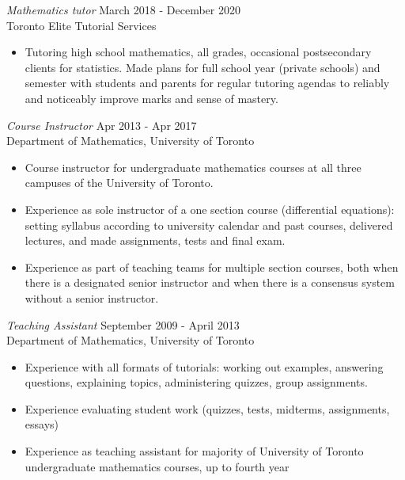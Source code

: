 \documentclass[margin, 10pt]{res} %
\begin{document}
\begin{resume}
{\sl Mathematics tutor} \hfill March 2018 - December 2020 \\
Toronto Elite Tutorial Services

\begin{itemize} \itemsep -2pt %
\item Tutoring high school mathematics, all grades, occasional postsecondary clients for statistics. Made plans for full school year (private schools) and semester with students and parents for regular tutoring agendas to reliably and noticeably improve marks and sense of mastery. 
\end{itemize}

{\sl Course Instructor} \hfill Apr 2013 - Apr 2017 \\
Department of Mathematics, University of Toronto

\begin{itemize} \itemsep -2pt %
\item Course instructor for undergraduate mathematics courses at all three campuses of the University of Toronto.

\item Experience as sole instructor of a one section course (differential equations): setting syllabus according to university calendar and past courses, delivered lectures, and made assignments, tests and final exam.

\item Experience as part of teaching teams for multiple section courses, both when there is a designated senior instructor and when there is a consensus system without a senior instructor.

\end{itemize}
 
{\sl Teaching Assistant} \hfill September 2009 - April 2013 \\
Department of Mathematics, University of Toronto

\begin{itemize} 
\item Experience with all formats of tutorials: working out examples, answering questions, explaining topics, administering quizzes, group assignments.
\item Experience evaluating student work (quizzes, tests, midterms, assignments, essays)
\item Experience as teaching assistant for majority of University of Toronto undergraduate mathematics courses, up to fourth year
\end{itemize} 


\end{resume}
\end{document}
